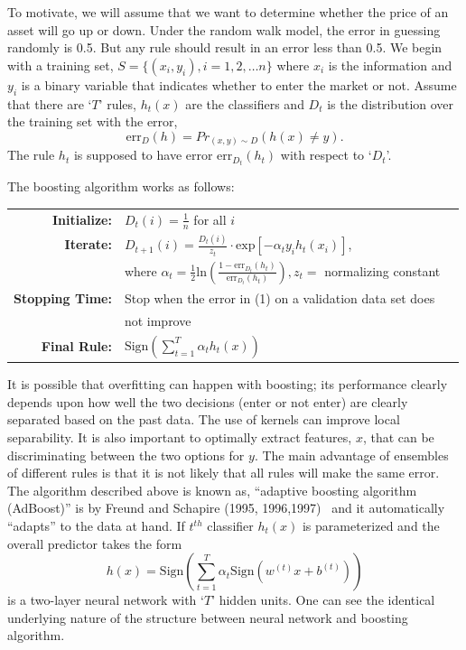 To motivate, we will assume that we want to determine whether the price of an asset will go up or down. Under the random walk model, the error in guessing randomly is 0.5. But any rule should result in an error less than 0.5. We begin with a training set, $S=\{ (x_i,y_i), i=1,2, \ldots n\}$ where $x_i$ is the information and $y_i$ is a binary variable that indicates whether to enter the market or not. Assume that there are `$T$' rules, $h_t(x)$ are the classifiers and $D_t$ is the distribution over the training set with the error,
	\begin{equation}
	\text{err}_D(h)=Pr_{(x,y) \sim D}(h(x) \neq y).
	\end{equation}
The rule $h_t$ is supposed to have error $\text{err}_{D_t}(h_t)$ with respect to `$D_t$'. \twomedskip


\noindent The boosting algorithm works as follows:

        \begin{table}[!ht]
        \begin{tabular}{r l r}
        \textbf{Initialize:} & $D_t(i)=\frac{1}{n}$ for all $i$  \\
        \textbf{Iterate:} & $D_{t+1}(i)=\frac{D_t(i)}{z_t} \cdot \text{exp}[-\alpha_t y_i h_t(x_i)]$, \\
        & where $\alpha_t=\frac{1}{2}\text{ln} \left( \frac{1-\text{err}_{D_t}(h_t)}{\text{err}_{D_t}(h_t)} \right), z_t=$ normalizing constant \\
        \textbf{Stopping Time:} & Stop when the error in (1) on a validation data set does \\
        & not improve \\
        \textbf{Final Rule:} & $\text{Sign}(\sum_{t=1}^T \alpha_t h_t(x))$  \\
        \end{tabular}
        \end{table}
 
 
 It is possible that overfitting can happen with boosting; its performance clearly depends upon how well the two decisions (enter or not enter) are clearly separated based on the past data. The use of kernels can improve local separability. It is also important to optimally extract features, $x$, that can be discriminating between the two options for $y$. The main advantage of ensembles of different rules is that it is not likely that all rules will make the same error. The algorithm described above is known as, ``adaptive boosting algorithm (AdBoost)'' is by Freund and Schapire (1995, 1996,1997)~\cite{freund1995decision,freund1996experiments,freund1997decision} and it automatically ``adapts'' to the data at hand. If $t^{th}$ classifier $h_t(x)$ is parameterized and the overall predictor takes the form
	\begin{equation}
	h(x)=\text{Sign} \left( \sum_{t=1}^T \alpha_t \text{Sign}(w^{(t)}x+b^{(t)}) \right)
	\end{equation}
is a two-layer neural network with `$T$' hidden units. One can see the identical underlying nature of the structure between neural network and boosting algorithm.


